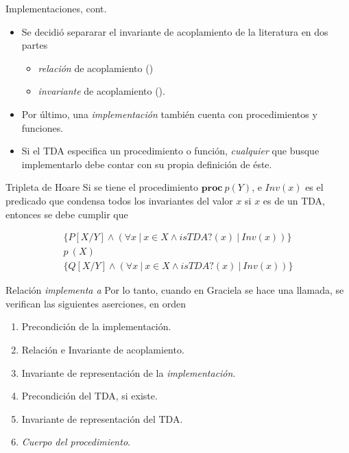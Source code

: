 \begin{frame}{Implementaciones, cont.}
\begin{itemize}
    \item Se decidió separarar el invariante de acoplamiento de la literatura en dos partes
    \begin{itemize}
      \item \textit{relación} de acoplamiento ()
      \item \textit{invariante} de acoplamiento ().
    \end{itemize}
  \item Por último, una \textit{implementación} también cuenta con procedimientos y funciones. 
  \item Si el TDA especifica un procedimiento o función, \textit{cualquier}  que busque implementarlo debe contar con su propia definición de éste.
\end{itemize}
\end{frame}

\begin{frame}{Tripleta de Hoare}
Si se tiene el procedimiento $\textbf{proc}\ p (Y)$, e $Inv(x)$ es el predicado que condensa todos los
invariantes del valor $x$ si $x$ es de un TDA, entonces se debe cumplir que

\begin{equation*} \label{eqn:tdatriple}
\begin{gathered}
  \{ P[X/Y] \land (\forall x\ |\ x \in X \land isTDA?(x)\ |\ Inv(x) )\}\\
  p\ (X)\\
  \{ Q[X/Y] \land (\forall x\ |\ x \in X \land isTDA?(x)\ |\ Inv(x) )\}
\end{gathered}
\end{equation*}
\end{frame}

\begin{frame}{Relación \textit{implementa a}}
Por lo tanto, cuando en Graciela se hace una llamada, se verifican las siguientes aserciones, en orden

\begin{enumerate}
  \item Precondición de la implementación.

  \item Relación e Invariante de acoplamiento.

  \item Invariante de representación de la \textit{implementación}.

  \item Precondición del TDA, si existe.

  \item Invariante de representación del TDA.

  \item \textit{Cuerpo del procedimiento}.


\end{enumerate}
\end{frame}

